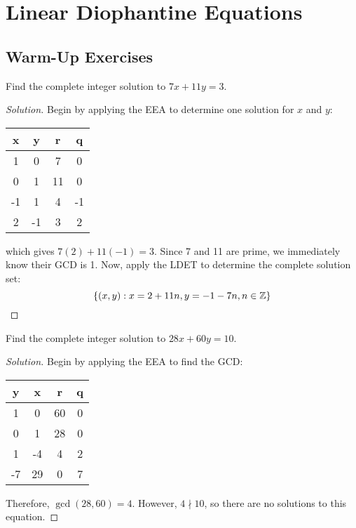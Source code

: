 \chapter{Linear Diophantine Equations}

\section{Warm-Up Exercises}

\begin{warmup}
  Find the complete integer solution to $7x+11y=3$.
\end{warmup}
\begin{proof}[Solution]
  Begin by applying the EEA to determine one solution for $x$ and $y$:
  \begin{center}
    \begin{tabular}{C|C|C|C}
      x  & y  & r  & q  \\   & 0  & 7  & 0  \\
      0  & 1  & 11 & 0  \\
      -1 & 1  & 4  & -1 \\
      2  & -1 & 3  & 2
    \end{tabular}
  \end{center}
  which gives $7(2)+11(-1)=3$.
  Since 7 and 11 are prime, we immediately know their GCD is 1.
  Now, apply the LDET to determine the complete solution set:
  \begin{equation*}
    \{ (x,y) : x = 2 + 11n, y = -1 - 7n, n\in\mathbb{Z} \} \qedhere
  \end{equation*}
\end{proof}


\begin{warmup}
  Find the complete integer solution to $28x+60y=10$.
\end{warmup}
\begin{proof}[Solution]
  Begin by applying the EEA to find the GCD\@:
  \begin{center}
    \begin{tabular}{C|C|C|C}
      y  & x  & r  & q \\   & 0  & 60 & 0 \\
      0  & 1  & 28 & 0 \\
      1  & -4 & 4  & 2 \\
      -7 & 29 & 0  & 7
    \end{tabular}
  \end{center}
  Therefore, $\gcd(28,60)=4$.
  However, $4 \nmid 10$, so there are no solutions to this equation.
\end{proof}


